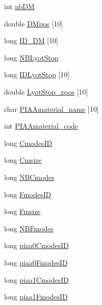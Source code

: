 \begin{DoxyCompactItemize}
\item 
int \hyperlink{structOPTPIAACMCDESIGN_abcbc2dfd1fde61c341f2689b1ed810dd}{nb\+D\+M}
\item 
double \hyperlink{structOPTPIAACMCDESIGN_a1ad053561e6eb268b4375e8896906265}{D\+Mpos} \mbox{[}10\mbox{]}
\item 
long \hyperlink{structOPTPIAACMCDESIGN_a6f2fda25c283798247f32662ef8f6668}{I\+D\+\_\+\+D\+M} \mbox{[}10\mbox{]}
\item 
long \hyperlink{structOPTPIAACMCDESIGN_aacf0223dec146b41ded13305b83c8ba6}{N\+B\+Lyot\+Stop}
\item 
long \hyperlink{structOPTPIAACMCDESIGN_a4d3bfec6f3c98569d484d2fd653eaffc}{I\+D\+Lyot\+Stop} \mbox{[}10\mbox{]}
\item 
double \hyperlink{structOPTPIAACMCDESIGN_ad04b5c8e2bc62360502fd69c669cb983}{Lyot\+Stop\+\_\+zpos} \mbox{[}10\mbox{]}
\item 
char \hyperlink{structOPTPIAACMCDESIGN_a91d282b651316c19a4fdf542baa9a4a5}{P\+I\+A\+Amaterial\+\_\+name} \mbox{[}10\mbox{]}
\item 
int \hyperlink{structOPTPIAACMCDESIGN_a9fc6f0b8de4e0e7fe0694cd8f4e827e1}{P\+I\+A\+Amaterial\+\_\+code}
\item 
long \hyperlink{structOPTPIAACMCDESIGN_a34261c3f4264eb64be04cacd186aa1fc}{Cmodes\+I\+D}
\item 
long \hyperlink{structOPTPIAACMCDESIGN_a0943c7f88d6cc19f0d93aec976c33abf}{Cmsize}
\item 
long \hyperlink{structOPTPIAACMCDESIGN_a8206d0c4c019d9c2a6dda4d22cf7d8a6}{N\+B\+Cmodes}
\item 
long \hyperlink{structOPTPIAACMCDESIGN_a6b13c1628f90db964d8279de9aee4f23}{Fmodes\+I\+D}
\item 
long \hyperlink{structOPTPIAACMCDESIGN_a0e84939f7dbafe942bc7725bd6ddfa8e}{Fmsize}
\item 
long \hyperlink{structOPTPIAACMCDESIGN_ac46c632c680659b8c588701a497dbb4b}{N\+B\+Fmodes}
\item 
long \hyperlink{structOPTPIAACMCDESIGN_a9b381fe9d31e74c5306577c8ca59116b}{piaa0\+Cmodes\+I\+D}
\item 
long \hyperlink{structOPTPIAACMCDESIGN_a9101237f5e1b7af8a40014685cb399b9}{piaa0\+Fmodes\+I\+D}
\item 
long \hyperlink{structOPTPIAACMCDESIGN_aa59c49ac1d770c1ee0e3bce22e4d5863}{piaa1\+Cmodes\+I\+D}
\item 
long \hyperlink{structOPTPIAACMCDESIGN_a5fa43c209dc396f65f2d74d3bb275e75}{piaa1\+Fmodes\+I\+D}
\item 

\end{DoxyCompactItemize}
